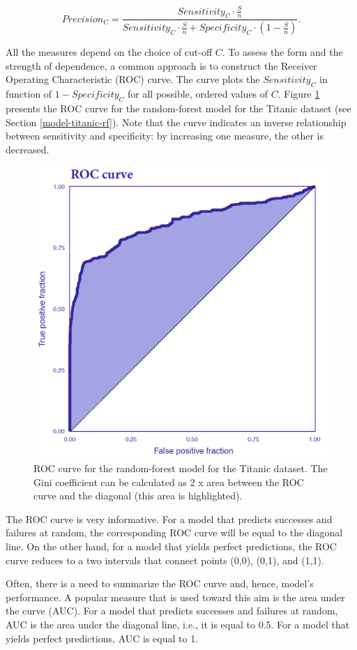 \documentclass[]{krantz}
\begin{document}
\[
Precision_C = \frac{Sensitivity_C \cdot \frac{S}{n}}{Sensitivity_C \cdot \frac{S}{n}+Specificity_C \cdot \left(1-\frac{S}{n}\right)}.
\]

All the measures depend on the choice of cut-off \(C\). To assess the form and the strength of dependence, a common approach is to construct the Receiver Operating Characteristic (ROC) curve. The curve plots the \(Sensitivity_C\) in function of \(1-Specificity_C\) for all possible, ordered values of \(C\). Figure \ref{fig:exampleROC} presents the ROC curve for the random-forest model for the Titanic dataset (see Section \ref{model-titanic-rf}). Note that the curve indicates an inverse relationship between sensitivity and specificity: by increasing one measure, the other is decreased.

\begin{figure}

{\centering \includegraphics[width=0.7\linewidth]{figure/ROCcurve} 

}

\caption{ROC curve for the random-forest model for the Titanic dataset. The Gini coefficient can be calculated as 2 x area between the ROC curve and the diagonal (this area is highlighted).}\label{fig:exampleROC}
\end{figure}

The ROC curve is very informative. For a model that predicts successes and failures at random, the corresponding ROC curve will be equal to the diagonal line. On the other hand, for a model that yields perfect predictions, the ROC curve reduces to a two intervals that connect points (0,0), (0,1), and (1,1).

Often, there is a need to summarize the ROC curve and, hence, model's performance. A popular measure that is used toward this aim is the area under the curve (AUC). For a model that predicts successes and failures at random, AUC is the area under the diagonal line, i.e., it is equal to 0.5. For a model that yields perfect predictions, AUC is equal to 1.
\end{document}
